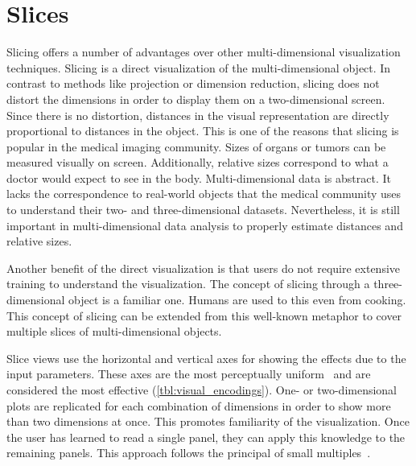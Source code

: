 
\section{Slices}
\label{sec:slicing-advantages}

Slicing offers a number of advantages over other multi-dimensional
visualization techniques. Slicing is a direct visualization of the
multi-dimensional object. In contrast to methods like projection or dimension
reduction, slicing does not distort the dimensions in order to display them on
a two-dimensional screen. Since there is no distortion, distances in the visual
representation are directly proportional to distances in the object. This is
one of the reasons that slicing is popular in the medical imaging community.
Sizes of organs or tumors can be measured visually on screen. Additionally,
relative sizes correspond to what a doctor would expect to see in the body.
Multi-dimensional data is abstract. It lacks the correspondence to real-world
objects that the medical community uses to understand their two- and
three-dimensional datasets. Nevertheless, it is still important in
multi-dimensional data analysis to properly estimate distances and relative
sizes. 

Another benefit of the direct visualization is that users do not require
extensive training to understand the visualization. The concept of slicing
through a three-dimensional object is a familiar one. Humans are used to this
even from cooking. This concept of slicing can be extended from this 
well-known metaphor to cover multiple slices of multi-dimensional objects.

Slice views use the horizontal and vertical axes for showing the effects due to
the input parameters. These axes are the most perceptually
uniform~\cite{Stevens:1957} and are considered the most effective
(\autoref{tbl:visual_encodings}). One- or two-dimensional
plots are replicated for each combination of dimensions in order to show more
than two dimensions at once. This promotes familiarity of the visualization.
Once the user has learned to read a single panel, they can apply this knowledge
to the remaining panels. This approach follows the principal of small
multiples~\cite{Archambault:2011}. 

